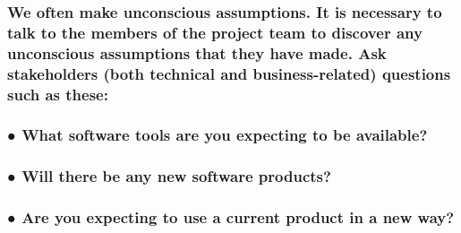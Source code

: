 \documentclass[
]{article}
\begin{document}
\hypertarget{we-often-make-unconscious-assumptions.-it-is-necessary-to-talk-to-the-members-of-the-project-team-to-discover-any-unconscious-assumptions-that-they-have-made.-ask-stakeholders-both-technical-and-business-related-questions-such-as-these}{%
\subsubsection{\texorpdfstring{We often make unconscious assumptions. It
is necessary to talk to the members of the project team to discover any
unconscious assumptions that they have made. Ask stakeholders (both
technical and business-related) questions such as these:
}{We often make unconscious assumptions. It is necessary to talk to the members of the project team to discover any unconscious assumptions that they have made. Ask stakeholders (both technical and business-related) questions such as these: }}\label{we-often-make-unconscious-assumptions.-it-is-necessary-to-talk-to-the-members-of-the-project-team-to-discover-any-unconscious-assumptions-that-they-have-made.-ask-stakeholders-both-technical-and-business-related-questions-such-as-these}}

\hypertarget{what-software-tools-are-you-expecting-to-be-available}{%
\subsubsection{\texorpdfstring{● What software tools are you expecting
to be available?
}{● What software tools are you expecting to be available? }}\label{what-software-tools-are-you-expecting-to-be-available}}

\hypertarget{will-there-be-any-new-software-products}{%
\subsubsection{\texorpdfstring{● Will there be any new software
products?
}{● Will there be any new software products? }}\label{will-there-be-any-new-software-products}}

\hypertarget{are-you-expecting-to-use-a-current-product-in-a-new-way}{%
\subsubsection{\texorpdfstring{● Are you expecting to use a current
product in a new way?
}{● Are you expecting to use a current product in a new way? }}\label{are-you-expecting-to-use-a-current-product-in-a-new-way}}
\end{document}
